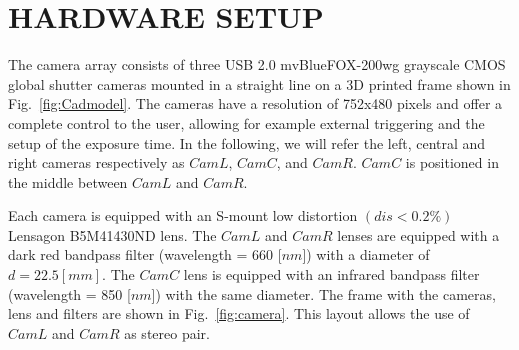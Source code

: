 \documentclass[letterpaper, 10pt, conference]{ieeeconf}      %
\begin{document}


\section{HARDWARE SETUP}\label{sec:hardware}



The camera array consists of three USB 2.0 mvBlueFOX-200wg grayscale CMOS global shutter cameras mounted in a straight line on a 3D printed frame shown in  Fig.~\ref{fig:Cadmodel}.
The cameras have a resolution of 752x480 pixels and offer a complete control to the user, allowing for example external triggering and the setup of the exposure time.
In the following, we will refer the left, central and right cameras respectively as $CamL$, $CamC$, and $CamR$. 
$CamC$ is positioned in the middle between $CamL$ and $CamR$.

Each camera is equipped with an S-mount low distortion $(dis< 0.2 \% )$ Lensagon B5M41430ND lens.
The $CamL$ and $CamR$ lenses are equipped with a dark red bandpass filter (wavelength = 660 [$ nm $]) with a diameter of $ d=22.5 [mm]$.
The $CamC$ lens is equipped with an infrared bandpass filter (wavelength = 850 [$ nm $]) with the same diameter.
The frame with the cameras, lens and filters  are shown in Fig.~\ref{fig:camera}.
This layout allows the use of $CamL$ and $CamR$ as stereo pair.
\end{document}
